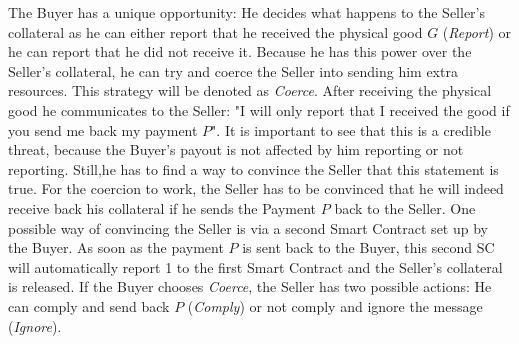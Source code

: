 \documentclass{cacthesis}
\begin{document}
The Buyer has a unique opportunity: He decides what happens to the Seller's
collateral as he can either report that he received the physical good $G$ (\emph{Report}) or he can report that he did not receive it. Because he has this power over the Seller's collateral, he can try and coerce the Seller into sending him extra resources. This
strategy will be denoted as \emph{Coerce}.  After receiving the physical good he communicates to the Seller: "I will only report that I received the good if you send me back my payment $P$". It is important to see that this is a credible threat, because the Buyer's payout is not affected by him reporting or not reporting. Still,he has to find a way to convince the Seller that this statement is true. For the coercion to work, the Seller has to be convinced that he will indeed receive back his collateral if he sends the Payment $P$ back to the Seller. One possible way of convincing the Seller is via a second Smart Contract set up by the Buyer. As soon as the payment $P$ is sent back to the Buyer, this second SC will automatically report 1 to the first Smart Contract and the Seller's collateral is released. If the Buyer chooses \emph{Coerce}, the Seller
has two possible actions: He can comply and send back $P$ (\emph{Comply}) or not comply
and ignore the message (\emph{Ignore}).\newline
\end{document}
